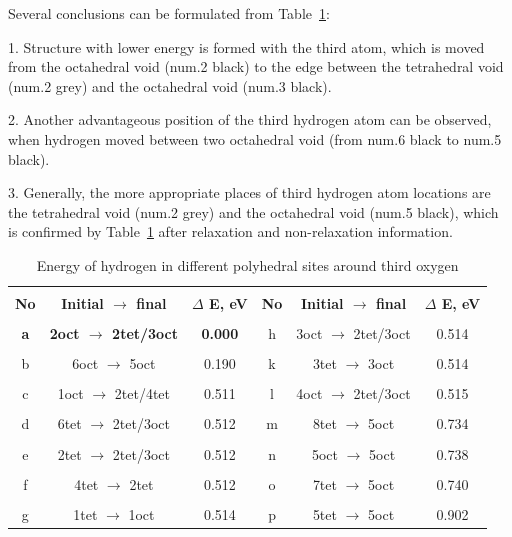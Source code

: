 
Several conclusions can be formulated from Table~\ref{energy3}:

1. Structure with lower energy is formed with the third atom, which is moved from the octahedral void (num.2 black) to the edge between the tetrahedral void (num.2 grey) and the octahedral void (num.3 black). 

2. Another advantageous position of the third hydrogen atom can be observed, when hydrogen moved between two octahedral void (from num.6 black to num.5 black).

3. Generally, the more appropriate places of third hydrogen atom locations are the tetrahedral void (num.2 grey) and the octahedral void (num.5 black), which is confirmed by Table~\ref{energy3} after relaxation and non-relaxation information. 

\begin{table}[h]
\caption{Energy of hydrogen in different polyhedral sites around third oxygen}
\label{energy3}
\begin{center}
\begin{tabular}{|c|c|c|c|c|c|}
\hline
& & & & & \\
 \textbf{No} & \textbf{Initial $\rightarrow$ final} & \textbf{$\Delta$ E, eV} & \textbf{No} & \textbf{Initial $\rightarrow$ final} & \textbf{$\Delta$ E, eV}\\ 
\hline
& & & & & \\
\textbf{a} & \textbf{2oct $\rightarrow$ 2tet/3oct} & \textbf{0.000} & h & 3oct $\rightarrow$ 2tet/3oct & 0.514 \\
\hline
& & & & & \\
b & 6oct $\rightarrow$ 5oct & 0.190 & k & 3tet $\rightarrow$ 3oct & 0.514 \\
\hline
& & & & & \\
c & 1oct $\rightarrow$ 2tet/4tet & 0.511 & l & 4oct $\rightarrow$ 2tet/3oct & 0.515 \\
\hline
& & & & & \\
d & 6tet $\rightarrow$ 2tet/3oct & 0.512 & m & 8tet $\rightarrow$ 5oct & 0.734 \\
\hline
& & & & & \\
e & 2tet $\rightarrow$ 2tet/3oct & 0.512 & n & 5oct $\rightarrow$ 5oct & 0.738 \\
\hline
& & & & & \\
f & 4tet $\rightarrow$ 2tet & 0.512 & o & 7tet $\rightarrow$ 5oct & 0.740\\
\hline
& & & & & \\
g & 1tet $\rightarrow$ 1oct & 0.514 & p & 5tet $\rightarrow$ 5oct & 0.902 \\
\hline
\end{tabular}
\end{center}
\end{table}

